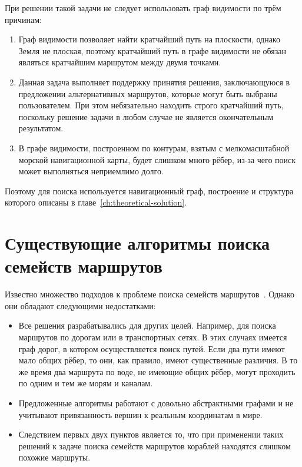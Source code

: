При решении такой задачи не следует использовать граф видимости по
трём причинам:
\begin{enumerate}
    \item Граф видимости позволяет найти кратчайший путь на плоскости,
      однако Земля не плоская, поэтому кратчайший путь в графе
      видимости не обязан являться кратчайшим маршрутом между двумя точками.
    \item Данная задача выполняет поддержку принятия решения,
      заключающуюся в предложении альтернативных маршрутов, которые
      могут быть выбраны пользователем. При этом небязательно находить
      строго кратчайший путь, поскольку решение задачи в любом случае
      не является окончательным результатом.
    \item В графе видимости, построенном по контурам, взятым с
      мелкомасштабной морской навигационной карты, будет слишком много
      рёбер, из-за чего поиск может выполняться неприемлимо долго.
\end{enumerate}
Поэтому для поиска используется навигационный граф, построение и
структура которого описаны в главе~\ref{ch:theoretical-solution}.

\FloatBarrier

\section{Существующие алгоритмы поиска семейств маршрутов}

\label{sec:existing-algos}

Известно множество подходов к проблеме поиска семейств
маршрутов~\cite{lim2005shortest, dial1971probabilistic, mafast}.
Однако они обладают следующими недостатками:
  
\begin{itemize}
    \item Все решения разрабатывались для других целей. Например, для
      поиска маршрутов по дорогам или в транспортных сетях. В этих
      случаях имеется граф дорог, в котором осуществляется поиск путей.
      Если два пути имеют мало общих рёбер, то они, как правило, имеют
      существенные различия. В то же время два маршрута по воде, не
      имеющие общих рёбер, могут проходить по одним и тем же морям и
      каналам.
    \item Предложенные алгоритмы работают с довольно абстрактными
      графами и не учитывают привязанность вершин к реальным координатам
      в мире.
    \item Следствием первых двух пунктов является то, что при
      применении таких решений к задаче поиска семейств маршрутов
      кораблей находятся слишком похожие маршруты.
\end{itemize}

